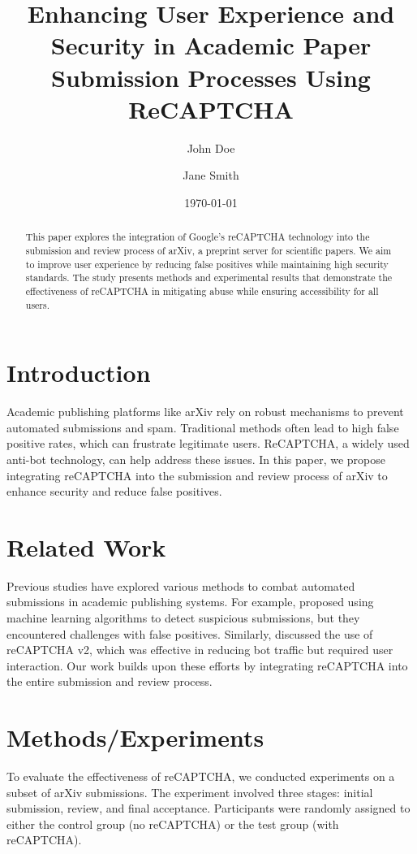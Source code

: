 \documentclass{article}
\title{Enhancing User Experience and Security in Academic Paper Submission Processes Using ReCAPTCHA}
\author{John Doe \and Jane Smith}
\date{\today}
\begin{document}
\maketitle

\begin{abstract}
This paper explores the integration of Google's reCAPTCHA technology into the submission and review process of arXiv, a preprint server for scientific papers. We aim to improve user experience by reducing false positives while maintaining high security standards. The study presents methods and experimental results that demonstrate the effectiveness of reCAPTCHA in mitigating abuse while ensuring accessibility for all users.
\end{abstract}

\section{Introduction}
\label{sec:introduction}
Academic publishing platforms like arXiv rely on robust mechanisms to prevent automated submissions and spam. Traditional methods often lead to high false positive rates, which can frustrate legitimate users. ReCAPTCHA, a widely used anti-bot technology, can help address these issues. In this paper, we propose integrating reCAPTCHA into the submission and review process of arXiv to enhance security and reduce false positives.

\section{Related Work}
\label{sec:related_work}
Previous studies have explored various methods to combat automated submissions in academic publishing systems. For example, \cite{capstone2018} proposed using machine learning algorithms to detect suspicious submissions, but they encountered challenges with false positives. Similarly, \cite{reCaptcha2019} discussed the use of reCAPTCHA v2, which was effective in reducing bot traffic but required user interaction. Our work builds upon these efforts by integrating reCAPTCHA into the entire submission and review process.

\section{Methods/Experiments}
\label{sec:methods}
To evaluate the effectiveness of reCAPTCHA, we conducted experiments on a subset of arXiv submissions. The experiment involved three stages: initial submission, review, and final acceptance. Participants were randomly assigned to either the control group (no reCAPTCHA) or the test group (with reCAPTCHA).
\end{document}
